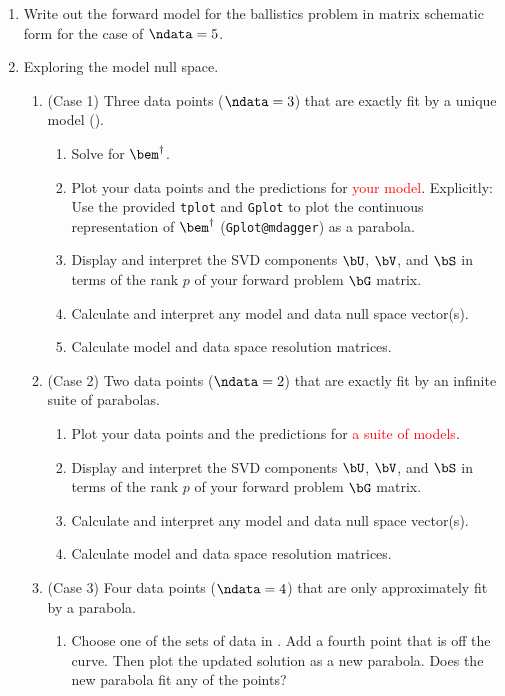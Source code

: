 \documentclass[11pt,titlepage,fleqn]{article}
\begin{document}
%
\begin{enumerate}
\item Write out the forward model for the ballistics problem in matrix schematic form for the case of $\ndata=5$.

\item Exploring the model null space.

\begin{enumerate}
\item (Case 1) Three data points ($\ndata = 3$) that are exactly fit by a unique model ().
%
\begin{enumerate}
\item Solve for $\bem^\dagger$.
\item Plot your data points and the predictions for \textcolor{red}{your model}.
Explicitly: Use the provided \verb+tplot+ and \verb+Gplot+ to plot the continuous representation of $\bem^\dagger$ (\ie \verb+Gplot@mdagger+) as a parabola.
\item Display and interpret the SVD components $\bU$, $\bV$, and $\bS$ in terms of the rank $p$ of your forward problem $\bG$ matrix.
\item Calculate and interpret any model and data null space vector(s).
\item Calculate model and data space resolution matrices.
\end{enumerate}

\item (Case 2) Two data points ($\ndata = 2$) that are exactly fit by an infinite suite of parabolas.
%
\begin{enumerate}
\item Plot your data points and the predictions for \textcolor{red}{a suite of models}.
\item Display and interpret the SVD components $\bU$, $\bV$, and $\bS$ in terms of the rank $p$ of your forward problem $\bG$ matrix.
\item Calculate and interpret any model and data null space vector(s).
\item Calculate model and data space resolution matrices.
\end{enumerate}

\item (Case 3) Four data points ($\ndata = 4$) that are only approximately fit by a parabola.
%
\begin{enumerate}
\item Choose one of the sets of data in . Add a fourth point that is off the curve. Then plot the updated solution as a new parabola. Does the new parabola fit any of the points?


\end{enumerate}
\end{enumerate}
\end{enumerate}
\end{document}
